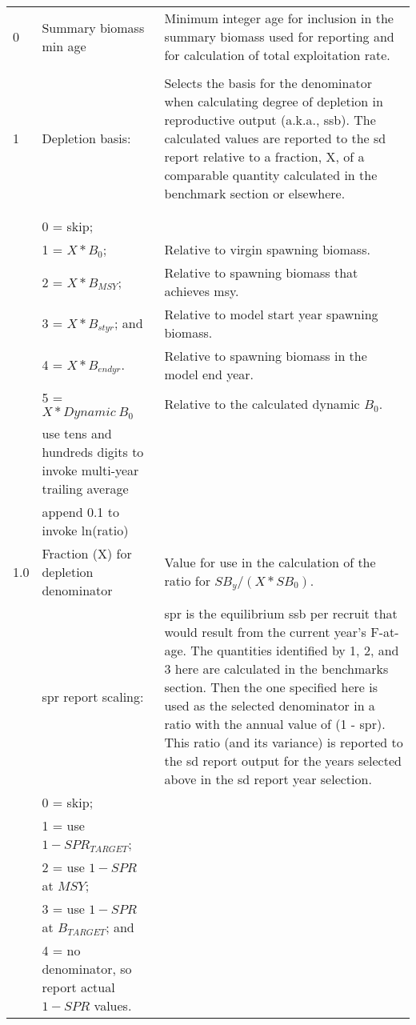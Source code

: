 {\begin{landscape}
\begin{longtable}{p{1.5cm} p{7.2cm} p{12.3cm}}
 \hline
 0 & Summary biomass min age & \multirow{1}{1cm}[-0.25cm]{\parbox{12.5cm}{Minimum integer age for inclusion in the summary biomass used for reporting and for calculation of total exploitation rate.}} \Tstrut\\
   & & \\ 

 \hline
 1 & Depletion basis: & \multirow{1}{1cm}[-0.25cm]{\parbox{12.5cm}{Selects the basis for the denominator when calculating degree of depletion in reproductive output (a.k.a., \gls{ssb}). The calculated values are reported to the \gls{sd} report relative to a fraction, X, of a comparable quantity calculated in the benchmark section or elsewhere.}} \Tstrut\\
   & & \\
   & & \\
   & 0 = skip; & \Tstrut \\
   & 1 = $X*B_{0}$; & Relative to virgin spawning biomass. \\
   & 2 = $X*B_{MSY}$; & Relative to spawning biomass that achieves \gls{msy}. \\
   & 3 = $X*B_{styr}$; and & Relative to model start year spawning biomass. \\
   & 4 = $X*B_{endyr}$. & Relative to spawning biomass in the model end year. \\
   & 5 = $X*Dynamic~B_{0}$ & Relative to the calculated dynamic $B_{0}$. \\
   & use tens and hundreds digits to invoke multi-year trailing average & \\
   & append 0.1 to invoke ln(ratio) & \Bstrut\\
  
 \hline
 1.0 & Fraction (X) for depletion denominator & Value for use in the calculation of the ratio for $SB_{y}/(X*SB_{0})$. \Tstrut\Bstrut\\

 \pagebreak
 1 & \Gls{spr} report scaling: & \multirow{1}{1cm}[-0.25cm]{\parbox{12.5cm}{\gls{spr} is the equilibrium \gls{ssb} per recruit that would result from the current year's F-at-age. The quantities identified by 1, 2, and 3 here are calculated in the benchmarks section. Then the one specified here is used as the selected denominator in a ratio with the annual value of (1 - \gls{spr}). This ratio (and its variance) is reported to the \gls{sd} report output for the years selected above in the \gls{sd} report year selection.}} \Tstrut\\
   & 0 = skip; & \\
   & 1 = use $1-SPR_{TARGET}$; & \\
   & 2 = use $1-SPR$ at $MSY$; & \Tstrut\\
   & 3 = use $1-SPR$ at $B_{TARGET}$; and &  \Tstrut\\
   & 4 = no denominator, so report actual $1-SPR$ values. & \\
  

\end{longtable}
\end{landscape}}
